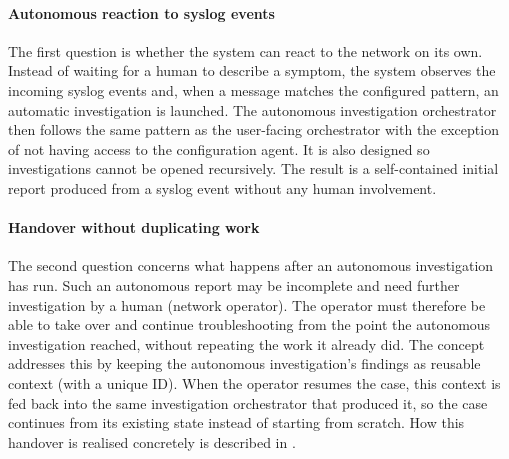 \paragraph{Autonomous reaction to syslog events}
The first question is whether the system can react to the network on its own. Instead of waiting for a human
to describe a symptom, the system observes the incoming syslog events and, when a message matches the configured pattern, an automatic investigation is launched. The autonomous investigation
orchestrator then follows the same pattern as the user-facing orchestrator with the exception of not having access to the configuration agent.
It is also designed so investigations cannot be opened recursively. The result is a self-contained initial report produced from a syslog event without any human
involvement.

\paragraph{Handover without duplicating work}
The second question concerns what happens after an autonomous investigation has run. Such an
autonomous report may be incomplete and need further investigation by a human (network operator).
The operator must therefore be able to take over and continue troubleshooting from the point the
autonomous investigation reached, without repeating the work it already did. The concept addresses
this by keeping the autonomous investigation's findings as reusable context (with a unique ID). When
the operator resumes the case, this context is fed back into the same investigation orchestrator that
produced it, so the case continues from its existing state instead of starting from scratch. How this
handover is realised concretely is described in .